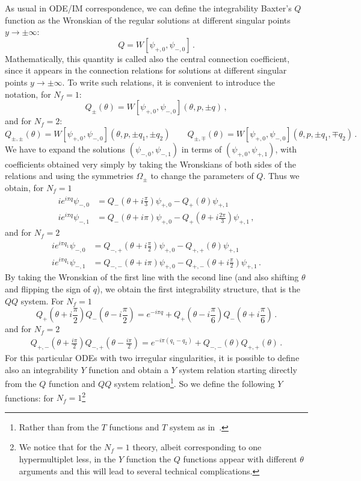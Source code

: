 \documentclass[11pt,a4paper]{elsarticle}
\def \th {\theta}
\def \ba {\begin{aligned}}
\def \ea {\end{aligned}}
\newcommand{\be}{\begin{equation}}
\newcommand{\ee}{\end{equation}}
\def\th{\theta}
\numberwithin{figure}{section}
\numberwithin{table}{section}
\begin{document}
As usual in ODE/IM correspondence, we can define the integrability Baxter's $Q$ function as the Wronskian of the regular solutions at different singular points $y \to \pm \infty$:
\be 
Q = W[\psi_{+,0} ,\psi_{-,0}] \,.
\ee 
Mathematically, this quantity is called also the central connection coefficient, since it appears in the connection relations for solutions at different singular points $y \to \pm \infty$. To write such relations, it is convenient to introduce the notation, for $N_f=1$:
\be \label{Qsignalt1}
Q_\pm(\th) =W[\psi_{+,0} ,\psi_{-,0}](\th,p,\pm q)\,,
\ee 
and for $N_f=2$:
\be  \label{Qsignalt2}
Q_{\pm,\pm}(\th) =W[\psi_{+,0} ,\psi_{-,0}](\th,p,\pm q_1,\pm q_2)\qquad Q_{\pm,\mp}(\th) =W[\psi_{+,0} ,\psi_{-,0}](\th,p,\pm q_1,\mp q_2)\,.
\ee 
We have to expand the solutions $(\psi_{-,0},\psi_{-,1})$ in terms of $(\psi_{+,0},\psi_{+,1})$, with coefficients obtained very simply by taking the Wronskians of both sides of the relations and using the symmetries $\Omega_{\pm}$ to change the parameters of $Q$. Thus we obtain, for $N_f=1$
\begin{align}\label{conn1-+}
i e^{i \pi q}\psi_{-,0}&=Q_-(\theta + i \frac{\pi}{3}) \psi_{+,0}-Q_+(\theta )\psi_{+,1}\\
i e^{i \pi q}\psi_{-,1}&=Q_-(\theta + i \pi ) \psi_{+,0}-Q_+(\theta + i\frac{2 \pi }{3})\psi_{+,1}\,,
\end{align}
and for $N_f=2$
\be 
\ba  \label{conn2-+}
i e^{i \pi q_1}\psi_{-,0}&=Q_{-,+}(\th+i\frac{\pi}{2})\psi_{+,0}- Q_{+,+}(\th)\psi_{+,1} \\
i e^{i \pi q_1}\psi_{-,1}&=Q_{-,-}(\th+i\pi)\psi_{+,0}-Q_{+,-}(\th+i\frac{\pi}{2})\psi_{+,1}\,.
\ea 
\ee
By taking the Wronskian of the first line with the second line (and also shifting $\th$ and flipping the sign of $q$), we obtain the first integrability structure, that is the $QQ$ system. For $N_f=1$
\be  \label{QQ1}
Q_+(\th+i\frac{\pi}{2})Q_-(\th-i\frac{\pi}{2})=e^{-i \pi q}+Q_+(\th-i\frac{\pi}{6})Q_-(\th+i\frac{\pi}{6})\,.
\ee 
and for $N_f=2$
\be  \label{QQ2}
\ba
Q_{+,-}(\th+\frac{i \pi}{2})Q_{-,+}(\th-\frac{i \pi}{2})
= e^{-i\pi (q_1-q_2)} +Q_{-,-}(\th)Q_{+,+}(\th)\,.
\ea
\ee 
For this particular ODEs with two irregular singularities, it is possible to define also an integrability $Y$ function and obtain a $Y$ system relation starting directly from the $Q$ function and $QQ$ system relation\footnote{Rather than from the $T$ functions and $T$ system as in~\cite{DoreyTateo1999}.}. So we define the following $Y$ functions: for $N_f=1$\footnote{We notice that for the $N_f=1$ theory, albeit corresponding to one hypermultiplet less, in the $Y$ function the $Q$ functions appear with different $\th$ arguments and this will lead to several technical complications.}
\end{document}
